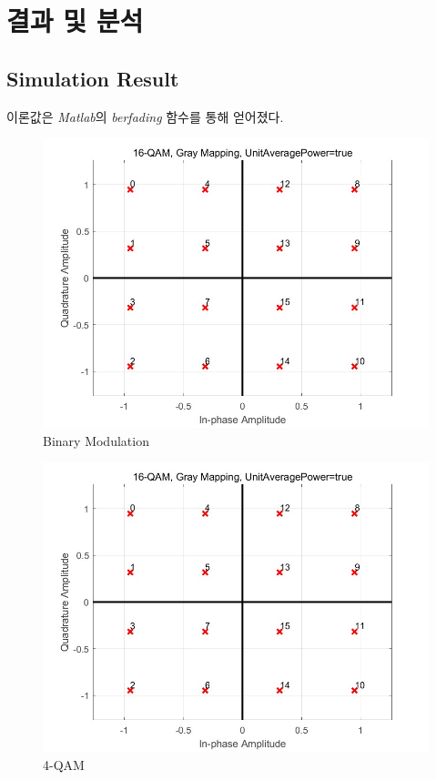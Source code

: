 \documentclass{article}
\begin{document}
\section{결과 및 분석}
\subsection{Simulation Result}
이론값은 \textsl{Matlab}의 \textsl{berfading} 함수를 통해 얻어졌다.
\begin{figure}
	\includegraphics[width=\textwidth]{16qamunit.jpg}
	\caption{Binary Modulation}
\end{figure}
\begin{figure}
	\includegraphics[width=\textwidth]{16qamunit.jpg}
	\caption{4-QAM}
\end{figure}
\end{document}
